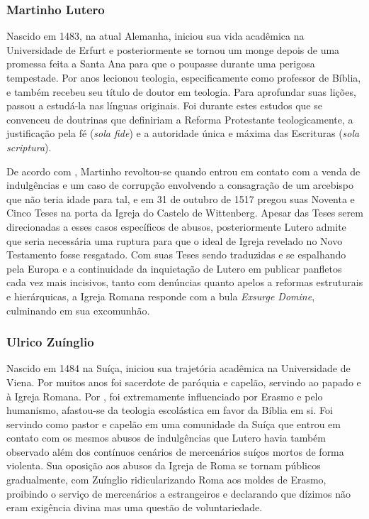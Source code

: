 \documentclass[
    article,            %
	12pt,				%
	oneside,			%
	a4paper,			%
	chapter=TITLE,		%
	section=TITLE,		%
	english,			%
	french,				%
	spanish,			%
	brazil				%
	]{abntex2}
\begin{document}
\subsubsection{Martinho Lutero}
Nascido em 1483, na atual Alemanha, iniciou sua vida acadêmica na Universidade de Erfurt e posteriormente se tornou um monge depois de uma promessa feita a Santa Ana para que o poupasse durante uma perigosa tempestade. Por anos lecionou teologia, especificamente como professor de Bíblia, e também recebeu seu título de doutor em teologia. Para aprofundar suas lições, passou a estudá-la nas línguas originais. Foi durante estes estudos que se convenceu de doutrinas que definiriam a Reforma Protestante teologicamente, a justificação pela fé (\emph{sola fide}) e a autoridade única e máxima das Escrituras (\emph{sola scriptura}).

De acordo com , Martinho revoltou-se quando entrou em contato com a venda de indulgências e um caso de corrupção envolvendo a consagração de um arcebispo que não teria idade para tal, e em 31 de outubro de 1517 pregou suas Noventa e Cinco Teses na porta da Igreja do Castelo de Wittenberg. Apesar das Teses serem direcionadas a esses casos específicos de abusos, posteriormente Lutero admite que seria necessária uma ruptura para que o ideal de Igreja revelado no Novo Testamento fosse resgatado. Com suas Teses sendo traduzidas e se espalhando pela Europa e a continuidade da inquietação de Lutero em publicar panfletos cada vez mais incisivos, tanto com denúncias quanto apelos a reformas estruturais e hierárquicas, a Igreja Romana responde com a bula \emph{Exsurge Domine}, culminando em sua excomunhão.

\subsubsection{Ulrico Zuínglio}
Nascido em 1484 na Suíça, iniciou sua trajetória acadêmica na Universidade de Viena. Por muitos anos foi sacerdote de paróquia e capelão, servindo ao papado e à Igreja Romana. Por , foi extremamente influenciado por Erasmo e pelo humanismo, afastou-se da teologia escolástica em favor da Bíblia em si. Foi servindo como pastor e capelão em uma comunidade da Suíça que entrou em contato com os mesmos abusos de indulgências que Lutero havia também observado além dos contínuos cenários de mercenários suíços mortos de forma violenta. Sua oposição aos abusos da Igreja de Roma se tornam públicos gradualmente, com Zuínglio ridicularizando Roma aos moldes de Erasmo, proibindo o serviço de mercenários a estrangeiros e declarando que dízimos não eram exigência divina mas uma questão de voluntariedade.
\end{document}

